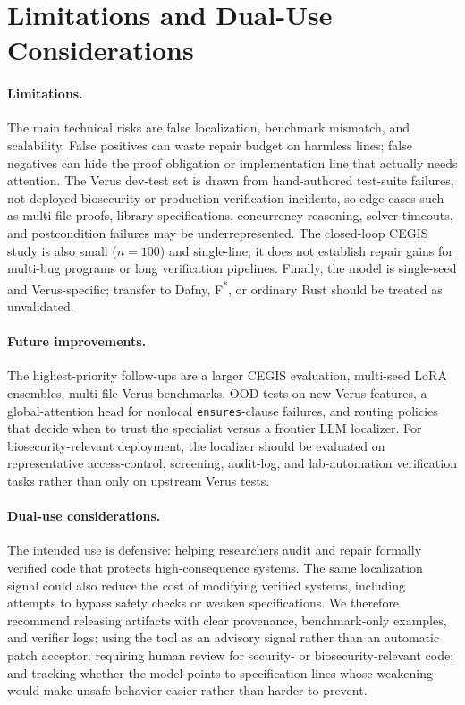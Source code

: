 \documentclass[10pt]{article}
\begin{document}
\appendix
\section{Limitations and Dual-Use Considerations}
\label{app:limitations-dual-use}

\paragraph{Limitations.}
The main technical risks are false localization, benchmark mismatch,
and scalability. False positives can waste repair budget on harmless
lines; false negatives can hide the proof obligation or implementation
line that actually needs attention. The Verus dev-test set is drawn
from hand-authored test-suite failures, not deployed biosecurity or
production-verification incidents, so edge cases such as multi-file
proofs, library specifications, concurrency reasoning, solver
timeouts, and postcondition failures may be underrepresented. The
closed-loop CEGIS study is also small ($n=100$) and single-line; it
does not establish repair gains for multi-bug programs or long
verification pipelines. Finally, the model is single-seed and
Verus-specific; transfer to Dafny, F\textsuperscript{*}, or ordinary
Rust should be treated as unvalidated.

\paragraph{Future improvements.}
The highest-priority follow-ups are a larger CEGIS evaluation,
multi-seed LoRA ensembles, multi-file Verus benchmarks, OOD tests on
new Verus features, a global-attention head for nonlocal
\texttt{ensures}-clause failures, and routing policies that decide when
to trust the specialist versus a frontier LLM localizer. For
biosecurity-relevant deployment, the localizer should be evaluated on
representative access-control, screening, audit-log, and lab-automation
verification tasks rather than only on upstream Verus tests.

\paragraph{Dual-use considerations.}
The intended use is defensive: helping researchers audit and repair
formally verified code that protects high-consequence systems. The same
localization signal could also reduce the cost of modifying verified
systems, including attempts to bypass safety checks or weaken
specifications. We therefore recommend releasing artifacts with clear
provenance, benchmark-only examples, and verifier logs; using the tool
as an advisory signal rather than an automatic patch acceptor; requiring
human review for security- or biosecurity-relevant code; and tracking
whether the model points to specification lines whose weakening would
make unsafe behavior easier rather than harder to prevent.
\end{document}
